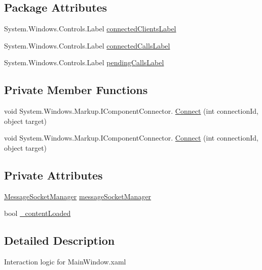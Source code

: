 \subsection*{Package Attributes}
\begin{DoxyCompactItemize}
\item 
System.\+Windows.\+Controls.\+Label \hyperlink{class_e_l_i_server_1_1_main_window_aab341ea0e21840106f606219464d28d1}{connected\+Clients\+Label}
\item 
System.\+Windows.\+Controls.\+Label \hyperlink{class_e_l_i_server_1_1_main_window_a52d218404ef3448c67c4cb90d869b052}{connected\+Calls\+Label}
\item 
System.\+Windows.\+Controls.\+Label \hyperlink{class_e_l_i_server_1_1_main_window_adefe9e0fcb15851978de1b8d0e39d470}{pending\+Calls\+Label}
\end{DoxyCompactItemize}
\subsection*{Private Member Functions}
\begin{DoxyCompactItemize}
\item 
void System.\+Windows.\+Markup.\+I\+Component\+Connector. \hyperlink{class_e_l_i_server_1_1_main_window_add73716251651a09e0c0cbc405c44d1f}{Connect} (int connection\+Id, object target)
\item 
void System.\+Windows.\+Markup.\+I\+Component\+Connector. \hyperlink{class_e_l_i_server_1_1_main_window_add73716251651a09e0c0cbc405c44d1f}{Connect} (int connection\+Id, object target)
\end{DoxyCompactItemize}
\subsection*{Private Attributes}
\begin{DoxyCompactItemize}
\item 
\hyperlink{class_e_l_i_server_1_1_message_socket_manager}{Message\+Socket\+Manager} \hyperlink{class_e_l_i_server_1_1_main_window_a1c3ef9e1cdaf4895b4e0d2ac61ed72cb}{message\+Socket\+Manager}
\item 
bool \hyperlink{class_e_l_i_server_1_1_main_window_a11d57d74bc6c4980e455404e1c588340}{\+\_\+content\+Loaded}
\end{DoxyCompactItemize}


\subsection{Detailed Description}
Interaction logic for Main\+Window.\+xaml 

